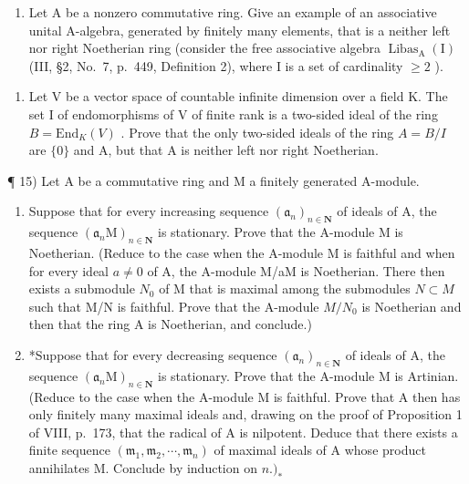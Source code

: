 \begin{enumerate}
\def\labelenumi{\alph{enumi})}
\setcounter{enumi}{1}
\tightlist
\item
  Let A be a nonzero commutative ring. Give an example of an associative unital A-algebra, generated by finitely many elements, that is a neither left nor right Noetherian ring (consider the free associative algebra \(\operatorname{Libas}_{\mathrm{A}}(\mathrm{I})\) (III, §2, No.~7, p.~449, Definition 2), where I is a set of cardinality \(\geqslant 2\) ).
\end{enumerate}

\begin{enumerate}
\def\labelenumi{\arabic{enumi})}
\setcounter{enumi}{13}
\tightlist
\item
  Let V be a vector space of countable infinite dimension over a field K. The set I of endomorphisms of V of finite rank is a two-sided ideal of the ring \(B = \text{End}_{K}(V)\) . Prove that the only two-sided ideals of the ring \(A = B/I\) are \(\{0\}\) and A, but that A is neither left nor right Noetherian.
\end{enumerate}

¶ 15) Let A be a commutative ring and M a finitely generated A-module.

\begin{enumerate}
\def\labelenumi{\alph{enumi})}
\item
  Suppose that for every increasing sequence \((\mathfrak{a}_{n})_{n\in\mathbf{N}}\) of ideals of A, the sequence \((\mathfrak{a}_{n}\mathrm{M})_{n\in\mathbf{N}}\) is stationary. Prove that the A-module M is Noetherian. (Reduce to the case when the A-module M is faithful and when for every ideal \(a\neq0\) of A, the A-module M/aM is Noetherian. There then exists a submodule \(N_{0}\) of M that is maximal among the submodules \(N\subset M\) such that M/N is faithful. Prove that the A-module \(M/N_{0}\) is Noetherian and then that the ring A is Noetherian, and conclude.)
\item
  *Suppose that for every decreasing sequence \((\mathfrak{a}_n)_{n \in \mathbf{N}}\) of ideals of A, the sequence \((\mathfrak{a}_n\mathrm{M})_{n \in \mathbf{N}}\) is stationary. Prove that the A-module M is Artinian. (Reduce to the case when the A-module M is faithful. Prove that A then has only finitely many maximal ideals and, drawing on the proof of Proposition 1 of VIII, p.~173, that the radical of A is nilpotent. Deduce that there exists a finite sequence \((\mathfrak{m}_{1}, \mathfrak{m}_{2}, \cdots, \mathfrak{m}_{n})\) of maximal ideals of A whose product annihilates M. Conclude by induction on \(n.)_{*}\)
\end{enumerate}

